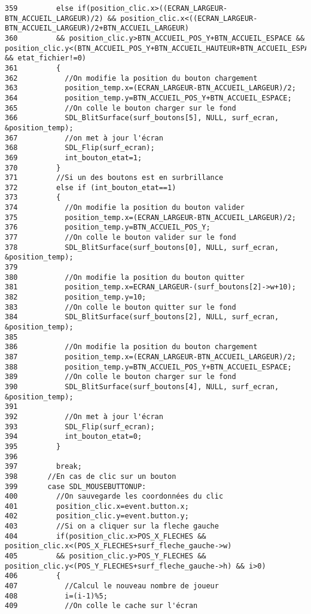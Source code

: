 \begin{Code}
\begin{verbatim}
359         else if(position_clic.x>((ECRAN_LARGEUR-BTN_ACCUEIL_LARGEUR)/2) && position_clic.x<((ECRAN_LARGEUR-BTN_ACCUEIL_LARGEUR)/2+BTN_ACCUEIL_LARGEUR)
360         && position_clic.y>BTN_ACCUEIL_POS_Y+BTN_ACCUEIL_ESPACE && position_clic.y<(BTN_ACCUEIL_POS_Y+BTN_ACCUEIL_HAUTEUR+BTN_ACCUEIL_ESPACE) && etat_fichier!=0)
361         {
362           //On modifie la position du bouton chargement
363           position_temp.x=(ECRAN_LARGEUR-BTN_ACCUEIL_LARGEUR)/2;
364           position_temp.y=BTN_ACCUEIL_POS_Y+BTN_ACCUEIL_ESPACE;
365           //On colle le bouton charger sur le fond
366           SDL_BlitSurface(surf_boutons[5], NULL, surf_ecran, &position_temp);
367           //on met à jour l'écran
368           SDL_Flip(surf_ecran);
369           int_bouton_etat=1;
370         }
371         //Si un des boutons est en surbrillance
372         else if (int_bouton_etat==1)
373         {
374           //On modifie la position du bouton valider
375           position_temp.x=(ECRAN_LARGEUR-BTN_ACCUEIL_LARGEUR)/2;
376           position_temp.y=BTN_ACCUEIL_POS_Y;
377           //On colle le bouton valider sur le fond
378           SDL_BlitSurface(surf_boutons[0], NULL, surf_ecran, &position_temp);
379 
380           //On modifie la position du bouton quitter
381           position_temp.x=ECRAN_LARGEUR-(surf_boutons[2]->w+10);
382           position_temp.y=10;
383           //On colle le bouton quitter sur le fond
384           SDL_BlitSurface(surf_boutons[2], NULL, surf_ecran, &position_temp);
385           
386           //On modifie la position du bouton chargement
387           position_temp.x=(ECRAN_LARGEUR-BTN_ACCUEIL_LARGEUR)/2;
388           position_temp.y=BTN_ACCUEIL_POS_Y+BTN_ACCUEIL_ESPACE;
389           //On colle le bouton charger sur le fond
390           SDL_BlitSurface(surf_boutons[4], NULL, surf_ecran, &position_temp);
391 
392           //On met à jour l'écran
393           SDL_Flip(surf_ecran);
394           int_bouton_etat=0;
395         }
396         
397         break;
398       //En cas de clic sur un bouton
399       case SDL_MOUSEBUTTONUP:
400         //On sauvegarde les coordonnées du clic
401         position_clic.x=event.button.x;
402         position_clic.y=event.button.y;
403         //Si on a cliquer sur la fleche gauche
404         if(position_clic.x>POS_X_FLECHES && position_clic.x<(POS_X_FLECHES+surf_fleche_gauche->w)
405         && position_clic.y>POS_Y_FLECHES && position_clic.y<(POS_Y_FLECHES+surf_fleche_gauche->h) && i>0)
406         {
407           //Calcul le nouveau nombre de joueur
408           i=(i-1)%5;
409           //On colle le cache sur l'écran

\end{verbatim}
\end{Code}
